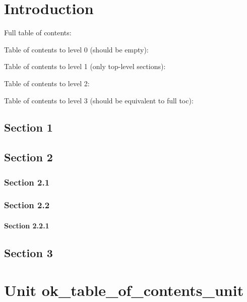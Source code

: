 \documentclass{report}
\newif\ifpdf
\begin{document}
\label{toc}\tableofcontents
\newpage
\newlength{\tmplength}
\chapter{Introduction}
\label{ok_table_of_contents}
Full table of contents:



Table of contents to level 0 (should be empty):



Table of contents to level 1 (only top{-}level sections):



Table of contents to level 2:



Table of contents to level 3 (should be equivalent to full toc):



\label{Sec1}
\section{Section 1}


\label{Sec2}
\section{Section 2}


\label{Sec21}
\ifpdf
\subsection*{\large{\textbf{Section 2.1}}\normalsize\hspace{1ex}\hrulefill}\else
\subsection*{Section 2.1}
\fi


\label{Sec22}
\ifpdf
\subsection*{\large{\textbf{Section 2.2}}\normalsize\hspace{1ex}\hrulefill}\else
\subsection*{Section 2.2}
\fi


\label{Sec221}
\subsubsection*{\large{\textbf{Section 2.2.1}}\normalsize\hspace{1ex}\hfill}


\label{Sec3}
\section{Section 3}
\chapter{Unit ok{\_}table{\_}of{\_}contents{\_}unit}
\label{ok_table_of_contents_unit}
\end{document}
